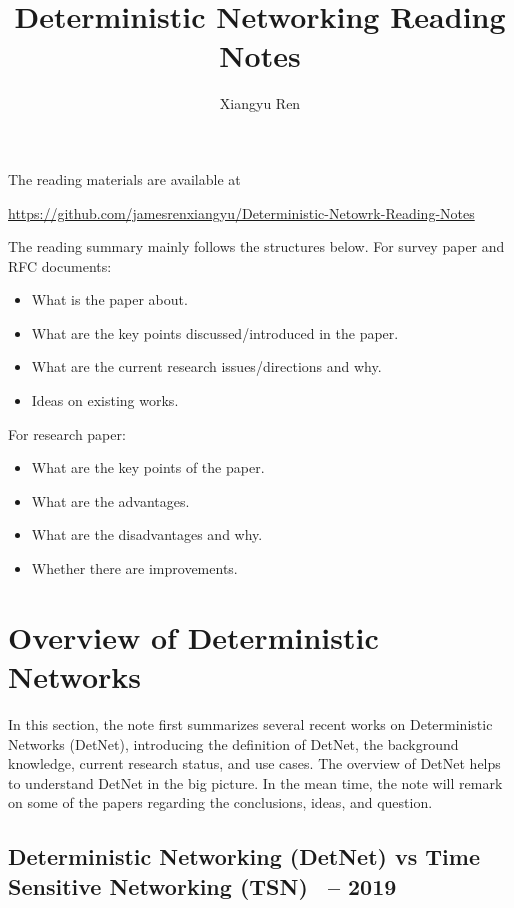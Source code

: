 \documentclass[12pt]{article}
\title{Deterministic Networking Reading Notes}
\author{Xiangyu Ren}
\date{}
\begin{document}

\maketitle%

\nn The reading materials are available at

\nn \url{https://github.com/jamesrenxiangyu/Deterministic-Netowrk-Reading-Notes }

\tableofcontents


\newpage
The reading summary mainly follows the structures below.
For survey paper and RFC documents:
\begin{itemize}
    \item What is the paper about.
    \item What are the key points discussed/introduced in the paper. 
    \item What are the current research issues/directions and why.
    \item Ideas on existing works.
\end{itemize}
For research paper:
\begin{itemize}
    \item What are the key points of the paper.
    \item What are the advantages.
    \item What are the disadvantages and why.
    \item Whether there are improvements.
\end{itemize}

\newpage

\section{Overview of Deterministic Networks}
In this section, the note first summarizes several recent works on Deterministic Networks (DetNet), introducing the definition of DetNet, the background knowledge, current research status, and use cases. The overview of DetNet helps to understand DetNet in the big picture. 
In the mean time, the note will remark on some of the papers regarding the conclusions, ideas, and question.


\subsection{Deterministic Networking (DetNet) vs Time Sensitive Networking (TSN)~\cite{yang2019deterministic} -- 2019}
\end{document}
